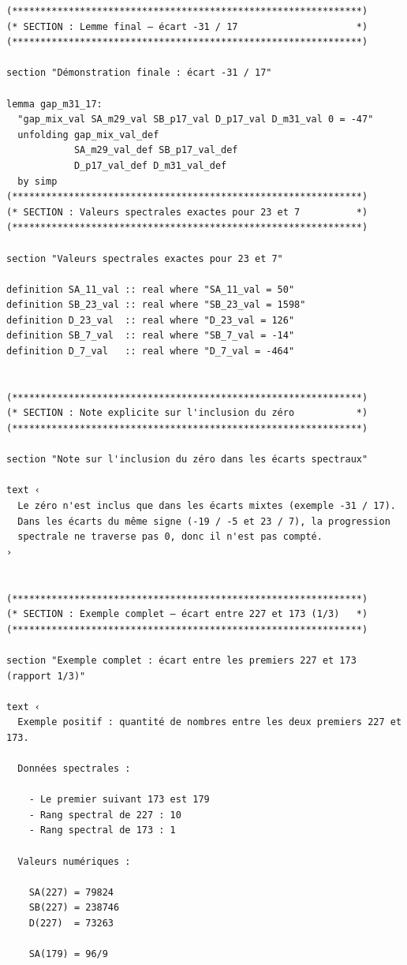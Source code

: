 \documentclass[a4paper,11pt]{article}
\begin{document}
\begin{holcode}[title={\textcolor{white}{File: methode\_spectral.thy -- Part 1/4}}]
\begin{lstlisting}
(**************************************************************)
(* SECTION : Lemme final – écart -31 / 17                     *)
(**************************************************************)

section "Démonstration finale : écart -31 / 17"

lemma gap_m31_17:
  "gap_mix_val SA_m29_val SB_p17_val D_p17_val D_m31_val 0 = -47"
  unfolding gap_mix_val_def
            SA_m29_val_def SB_p17_val_def
            D_p17_val_def D_m31_val_def
  by simp
(**************************************************************)
(* SECTION : Valeurs spectrales exactes pour 23 et 7          *)
(**************************************************************)

section "Valeurs spectrales exactes pour 23 et 7"

definition SA_11_val :: real where "SA_11_val = 50"
definition SB_23_val :: real where "SB_23_val = 1598"
definition D_23_val  :: real where "D_23_val = 126"
definition SB_7_val  :: real where "SB_7_val = -14"
definition D_7_val   :: real where "D_7_val = -464"


(**************************************************************)
(* SECTION : Note explicite sur l'inclusion du zéro           *)
(**************************************************************)

section "Note sur l'inclusion du zéro dans les écarts spectraux"

text ‹
  Le zéro n'est inclus que dans les écarts mixtes (exemple -31 / 17).
  Dans les écarts du même signe (-19 / -5 et 23 / 7), la progression
  spectrale ne traverse pas 0, donc il n'est pas compté.
›


(**************************************************************)
(* SECTION : Exemple complet – écart entre 227 et 173 (1/3)   *)
(**************************************************************)

section "Exemple complet : écart entre les premiers 227 et 173 (rapport 1/3)"

text ‹
  Exemple positif : quantité de nombres entre les deux premiers 227 et 173.

  Données spectrales :

    - Le premier suivant 173 est 179
    - Rang spectral de 227 : 10
    - Rang spectral de 173 : 1

  Valeurs numériques :

    SA(227) = 79824
    SB(227) = 238746
    D(227)  = 73263

    SA(179) = 96/9


\end{lstlisting}
\end{holcode}
\end{document}
